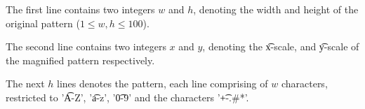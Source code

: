 The first line contains two integers $w$ and $h$,
denoting the width and height of the original pattern ($1 \le w, h \le 100$).

The second line contains two integers $x$ and $y$, denoting the \t{x-scale}, and \t{y-scale}
of the magnified pattern respectively.

The next $h$ lines denotes the pattern, each line comprising of $w$ characters,
restricted to '\t{A-Z}', '\t{a-z}', '\t{0-9}' and the characters '\t{+-.\#*}'.
